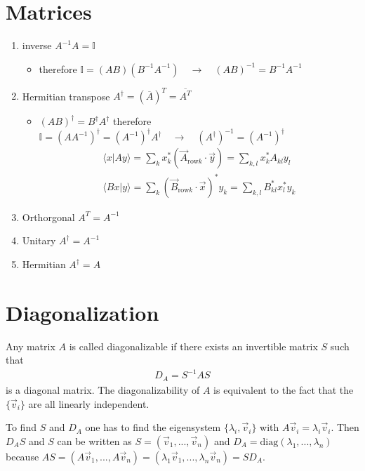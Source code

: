 \documentclass[10pt,a4paper]{book}
\theoremstyle{definition}
\begin{document}
\section{Matrices}
\begin{enumerate}
    \item inverse $A^{-1}A=\mathbb{I}$
    \begin{itemize}
        \item therefore $\mathbb{I}=(AB)(B^{-1}A^{-1})\quad\rightarrow\quad (AB)^{-1}=B^{-1}A^{-1}$
    \end{itemize}
    \item Hermitian transpose $A^\dagger = (\overline{A})^T = \overline{A^T}$
        \begin{itemize}
        \item $(AB)^\dagger=B^\dagger A^\dagger$ therefore $\mathbb{I}=(AA^{-1})^\dagger=(A^{-1})^\dagger A^\dagger\quad\rightarrow\quad (A^\dagger)^{-1}=(A^{-1})^\dagger$
        \begin{align}
        \langle x |A y\rangle=\sum_k x_k^* (\vec{A}_{\text{row}k}\cdot\vec{y})=\sum_{k,l} x_k^* A_{kl}y_l\\
        \langle Bx |y\rangle = \sum_k(\vec{B}_{\text{row}k}\cdot \vec{x})^*y_k= \sum_{k,l}B_{kl}^*x_l^*y_k
        \end{align}
    \end{itemize}
    \item Orthorgonal $A^T = A^{-1}$
    \item Unitary $A^\dagger = A^{-1}$
    \item Hermitian $A^\dagger = A$
\end{enumerate}

\section{Diagonalization}
Any  matrix $A$ is called diagonalizable if there exists an invertible matrix $S$ such that
\begin{align}
    D_A=S^{-1}AS
\end{align}
is a diagonal matrix. The diagonalizability of $A$ is equivalent to the fact that the $\{\vec{v}_i\}$ are all linearly independent.

To find $S$ and $D_A$ one has to find the eigensystem $\{\lambda_i,\vec{v}_i\}$ with $A\vec{v}_i=\lambda_i\vec{v}_i$. Then $D_AS$ and $S$ can be written as $S=(\vec{v}_1,...,\vec{v}_n)$ and $D_A=\text{diag}(\lambda_1,...,\lambda_n)$ because $AS=(A\vec{v}_1,...,A\vec{v}_n)=(\lambda_1\vec{v}_1,...,\lambda_n\vec{v}_n)=SD_A$.
\end{document}
